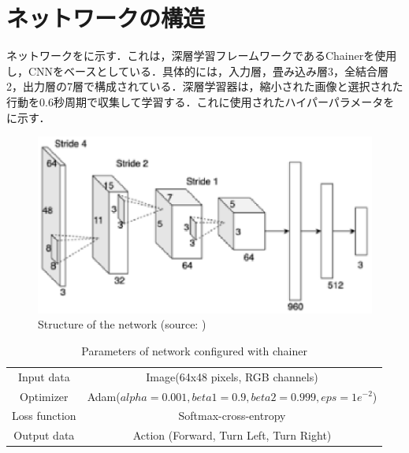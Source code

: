 
\section{ネットワークの構造}

  ネットワークをに示す．これは，深層学習フレームワークであるChainer\cite{chainer}を使用し，CNNをベースとしている．具体的には，入力層，畳み込み層3，全結合層2，出力層の7層で構成されている．深層学習器は，縮小された画像と選択された行動を0.6秒周期で収集して学習する．これに使用されたハイパーパラメータをに示す．

  \begin{figure}[h]
    \centering
    \includegraphics[keepaspectratio, scale=0.70] {images/eps/okada_network}
    \caption[Structure of the network]{Structure of the network (source: \cite{okada})}
    \label{Fig:okada_network}
  \end{figure}

  \begin{table}[hbtp]
    \caption{Parameters of network configured with chainer}
    \label{tab:Parameters of network configured with chainer}
    \centering
    \begin{tabular}{cc}
      \hline
      Input data & Image(64x48 pixels, RGB channels) \\
      Optimizer & Adam($alpha = 0.001, beta1 = 0.9, beta2 =  0.999, eps = 1e^{-2}$)\\
      Loss function & Softmax-cross-entropy\\
      Output data & Action (Forward, Turn Left, Turn Right)\\
      \hline
    \end{tabular}
  \end{table}

\newpage